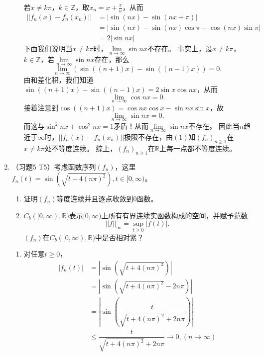 \begin{enumerate}
\begin{answer}
\begin{enumerate}
      若$x\neq  k\pi$，$k\in\mathbb{Z}$，取$x_n=x+\frac{\pi}{n}$，从而
      \[\begin{aligned}
      ||f_n(x)-f_n(x_n)||&=|\sin (nx)-\sin(nx+\pi)|\\
      &=|\sin (nx)-\sin(nx)\cos\pi-\cos(nx)\sin\pi|\\
                        &=2|\sin nx|
      \end{aligned}\] 
      下面我们说明当$x\neq k\pi$时，$\lim\limits_{n\rightarrow \infty}\sin nx$不存在。 
      事实上，设$x\neq k\pi$，$k\in\mathbb{Z}$，若$\lim\limits_{n\rightarrow \infty} \sin nx$存在，那么
      \[\lim\limits_{n\rightarrow \infty} (\sin((n+1)x)-\sin((n-1)x))=0.\]
      由和差化积，我们知道$\sin((n+1)x)-\sin((n-1)x)=2\sin x\cos nx$，从而
      \[\lim\limits_{n\rightarrow \infty} \cos nx=0.\]
      接着注意到$\cos((n+1)x)=\cos nx\cos x-\sin nx\sin x$，故\[\lim\limits_{n\rightarrow \infty} \sin nx =0,\]而这与$\sin^2 nx+\cos^2 nx=1$矛盾！从而$\lim\limits_{n\rightarrow \infty} \sin nx$不存在。 
      因此当$n$趋近于$\infty$时，$||f_n(x)-f_n(x_n)||$极限不存在，由$(1)$知$(f_n)_{n\geqslant 1}$在$x\neq  k\pi$处不等度连续。 综上，$(f_n)_{n\geqslant 1}$在$\mathbb{R}$上每一点都不等度连续。
      \end{enumerate}
    \end{answer}
  \item （习题5 T5）考虑函数序列$(f_n)$，这里$f_n(t)=\sin(\sqrt{t+4(n\pi)^2}),t\in[0,\infty)$。 
    \begin{enumerate}
      \item 证明$(f_n)$等度连续并且逐点收敛到$0$函数。 
      \item $C_b([0,\infty),\mathbb{R})$表示$[0,\infty)$上所有有界连续实函数构成的空间，并赋予范数
      \[ ||f||_\infty=\sup_{t\geqslant 0}|f(t)|.\] 
      $(f_n)$在$C_b([0,\infty),\mathbb{R})$中是否相对紧？ 
    \end{enumerate}
    \begin{answer}
      \begin{enumerate}
        \item 对任意$t\geqslant 0$，
        \[\begin{aligned}
          |f_n(t)|&=|\sin(\sqrt{t+4(n\pi)^2})|\\
                  &=|\sin(\sqrt{t+4(n\pi)^2}-2n\pi)|\\
                  &=|\sin(\dfrac{t}{\sqrt{t+4(n\pi)^2}+2n\pi})|\\
                  &\leqslant \dfrac{t}{\sqrt{t+4(n\pi)^2}+2n\pi}\rightarrow 0,(n\rightarrow \infty)
        \end{aligned}\] 

\end{enumerate}
\end{answer}
\end{enumerate}
